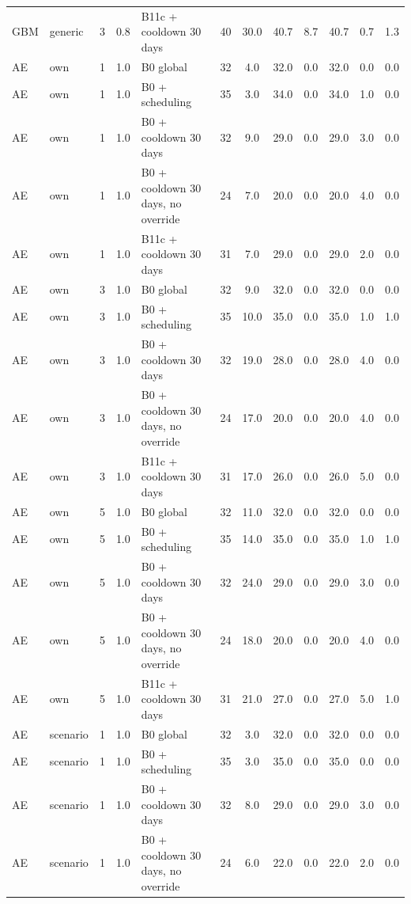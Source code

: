 \documentclass[10pt,onecolumn,letterpaper]{article}
\begin{document}
\begin{longtable}{lllllccccccc}
GBM & generic & 3 & 0.8 & B11c + cooldown 30 days & 40 & 30.0 & 40.7 & 8.7 & 40.7 & 0.7 & 1.3 \\
AE & own & 1 & 1.0 & B0 global & 32 & 4.0 & 32.0 & 0.0 & 32.0 & 0.0 & 0.0 \\
AE & own & 1 & 1.0 & B0 + scheduling & 35 & 3.0 & 34.0 & 0.0 & 34.0 & 1.0 & 0.0 \\
AE & own & 1 & 1.0 & B0 + cooldown 30 days & 32 & 9.0 & 29.0 & 0.0 & 29.0 & 3.0 & 0.0 \\
AE & own & 1 & 1.0 & B0 + cooldown 30 days, no override & 24 & 7.0 & 20.0 & 0.0 & 20.0 & 4.0 & 0.0 \\
AE & own & 1 & 1.0 & B11c + cooldown 30 days & 31 & 7.0 & 29.0 & 0.0 & 29.0 & 2.0 & 0.0 \\
AE & own & 3 & 1.0 & B0 global & 32 & 9.0 & 32.0 & 0.0 & 32.0 & 0.0 & 0.0 \\
AE & own & 3 & 1.0 & B0 + scheduling & 35 & 10.0 & 35.0 & 0.0 & 35.0 & 1.0 & 1.0 \\
AE & own & 3 & 1.0 & B0 + cooldown 30 days & 32 & 19.0 & 28.0 & 0.0 & 28.0 & 4.0 & 0.0 \\
AE & own & 3 & 1.0 & B0 + cooldown 30 days, no override & 24 & 17.0 & 20.0 & 0.0 & 20.0 & 4.0 & 0.0 \\
AE & own & 3 & 1.0 & B11c + cooldown 30 days & 31 & 17.0 & 26.0 & 0.0 & 26.0 & 5.0 & 0.0 \\
AE & own & 5 & 1.0 & B0 global & 32 & 11.0 & 32.0 & 0.0 & 32.0 & 0.0 & 0.0 \\
AE & own & 5 & 1.0 & B0 + scheduling & 35 & 14.0 & 35.0 & 0.0 & 35.0 & 1.0 & 1.0 \\
AE & own & 5 & 1.0 & B0 + cooldown 30 days & 32 & 24.0 & 29.0 & 0.0 & 29.0 & 3.0 & 0.0 \\
AE & own & 5 & 1.0 & B0 + cooldown 30 days, no override & 24 & 18.0 & 20.0 & 0.0 & 20.0 & 4.0 & 0.0 \\
AE & own & 5 & 1.0 & B11c + cooldown 30 days & 31 & 21.0 & 27.0 & 0.0 & 27.0 & 5.0 & 1.0 \\
AE & scenario & 1 & 1.0 & B0 global & 32 & 3.0 & 32.0 & 0.0 & 32.0 & 0.0 & 0.0 \\
AE & scenario & 1 & 1.0 & B0 + scheduling & 35 & 3.0 & 35.0 & 0.0 & 35.0 & 0.0 & 0.0 \\
AE & scenario & 1 & 1.0 & B0 + cooldown 30 days & 32 & 8.0 & 29.0 & 0.0 & 29.0 & 3.0 & 0.0 \\
AE & scenario & 1 & 1.0 & B0 + cooldown 30 days, no override & 24 & 6.0 & 22.0 & 0.0 & 22.0 & 2.0 & 0.0 \\

\end{longtable}
\end{document}
